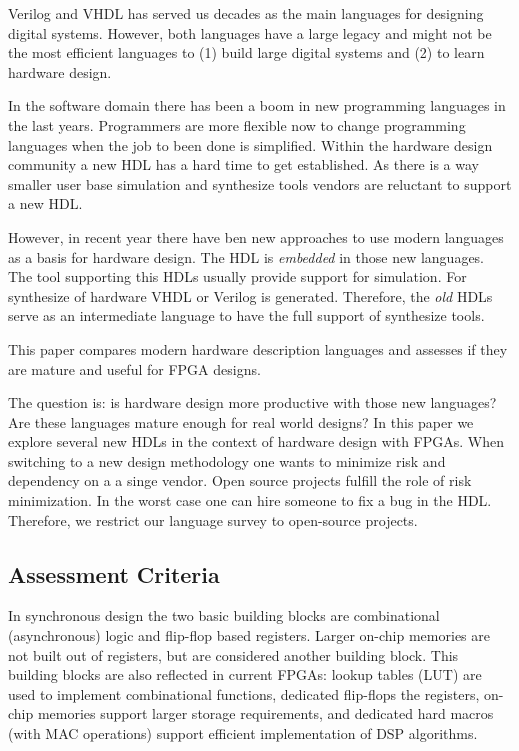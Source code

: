 \documentclass[10pt, conference, compsocconf]{IEEEtran}
\begin{document}
Verilog and VHDL has served us decades as the main languages for designing
digital systems. However, both languages have a large legacy and might not be
the most efficient languages to (1) build large digital systems and (2) to learn
hardware design.

In the software domain there has been a boom in new programming languages
in the last years. Programmers are more flexible now to change programming
languages when the job to been done is simplified. Within the hardware design
community a new HDL has a hard time to get established. As there is a way
smaller user base simulation and synthesize tools vendors are reluctant to
support a new HDL.

However, in recent year there have ben new approaches to use modern
languages as a basis for hardware design. The HDL is \emph{embedded}
in those new languages. The tool supporting this HDLs usually provide
support for simulation. For synthesize of hardware VHDL or Verilog is
generated. Therefore, the \emph{old} HDLs serve as an intermediate
language to have the full support of synthesize tools.

This paper compares modern hardware description languages and
assesses if they are mature and useful for FPGA designs.

The question is: is hardware design more productive with those new
languages? Are these languages mature enough for real world designs?
In this paper we explore several new HDLs in the context of hardware
design with FPGAs. When switching to a new design methodology one
wants to minimize risk and dependency on a a singe vendor. Open source
projects fulfill the role of risk minimization. In the worst case one can hire
someone to fix a bug in the HDL. Therefore, we restrict our language survey
to open-source projects.

\subsection{Assessment Criteria}


In synchronous design the two basic building blocks are combinational
(asynchronous) logic and flip-flop based registers. Larger on-chip
memories are not built out of registers, but are considered another building
block. This building blocks are also reflected in current FPGAs: lookup tables
(LUT) are used to implement combinational functions, dedicated flip-flops
the registers, on-chip memories support larger storage requirements,
and dedicated hard macros (with MAC operations) support efficient
implementation of DSP algorithms.
\end{document}
